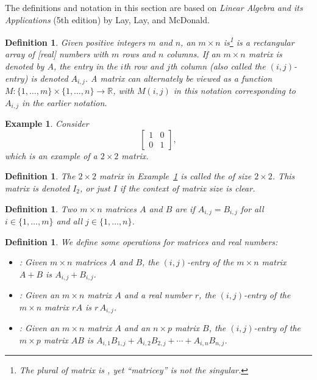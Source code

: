 \documentclass{book}
\newcounter{ekcounter}%
\theoremstyle{ekimcustom}
\newtheorem{example}[ekcounter]{Example}
\newtheorem{definition}[ekcounter]{Definition}
\newcommand\defn[1]{{\color{blue}{\bf #1}}}
\begin{document}
The definitions and notation in this section are based on \emph{Linear Algebra and its Applications} (5th edition) by Lay, Lay, and McDonald. %

\begin{definition}
Given positive integers $m$ and $n$, an $m \times n$ \defn{matrix} is\footnote{The plural of matrix is \defn{matrices}, yet ``matricey'' is not the singular.} is a rectangular array of [real] numbers with $m$ rows and $n$ columns. If an $m \times n$ matrix is denoted by $A$, the entry in the $i$th row and $j$th column (also called the $(i,j)$-entry) is denoted $A_{i,j}$. A matrix can alternately be viewed as a function $M : \{1,\dots,m\} \times \{1,\dots,n\} \to \mathbb{R}$, with $M(i,j)$ in this notation corresponding to $A_{i,j}$ in the earlier notation.
\end{definition}

\begin{example}\label{example:2x2identitymatrix}
Consider
\[\left[\begin{array}{cc}1&0\\0&1\end{array}\right],\]
which is an example of a $2 \times 2$ matrix.
\end{example}

\begin{definition}
The $2 \times 2$ matrix in Example~\ref{example:2x2identitymatrix} is called the \defn{identity matrix} of size $2 \times 2$. This matrix is denoted $I_{2}$, or just $I$ if the context of matrix size is clear.
\end{definition}

\begin{definition}
Two $m \times n$ matrices $A$ and $B$ are \defn{equal} if $A_{i,j}=B_{i,j}$ for all $i \in \{1,\dots,m\}$ and all $j \in \{1,\dots,n\}$.
\end{definition}

\begin{definition}
We define some operations for matrices and real numbers:
\begin{itemize}
\item \defn{matrix addition}: Given $m \times n$ matrices $A$ and $B$, the $(i,j)$-entry of the $m \times n$ matrix $A+B$ is $A_{i,j}+B_{i,j}$.
\item \defn{scalar multiplication}: Given an $m \times n$ matrix $A$ and a real number $r$, the $(i,j)$-entry of the $m \times n$ matrix $rA$ is $r\,A_{i,j}$.
\item \defn{matrix multiplication}: Given an $m \times n$ matrix $A$ and an $n \times p$ matrix $B$, the $(i,j)$-entry of the $m \times p$ matrix $AB$ is $A_{i,1}B_{1,j}+A_{i,2}B_{2,j}+\cdots+A_{i,n}B_{n,j}$.
\end{itemize}
\end{definition}
\end{document}
